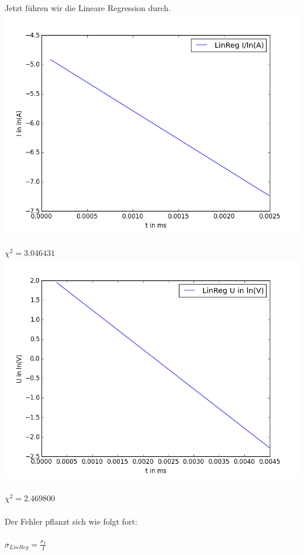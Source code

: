 \documentclass[12pt,a4paper]{article}
\begin{document}
\\Jetzt führen wir die Lineare Regression durch.\\
\includegraphics[scale=0.35]{lin_reg_I}\\
\\$\chi^2 = 3.046431$\\
\includegraphics[scale=0.35]{lin_reg_U}\\
\\$\chi^2 = 2.469800$\\
\\Der Fehler pflanzt sich wie folgt fort:\\
\\$\sigma_{LinReg} = \frac{\sigma_I}{I}$\\
\end{document}
